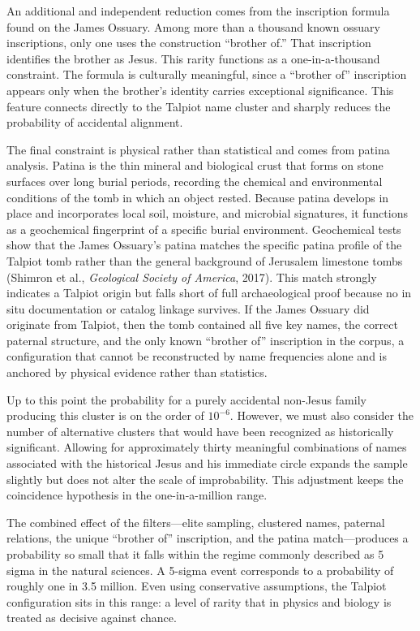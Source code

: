 An additional and independent reduction comes from the inscription formula found on the James Ossuary.
Among more than a thousand known ossuary inscriptions, only one uses the construction ``brother of.''
That inscription identifies the brother as Jesus.
This rarity functions as a one-in-a-thousand constraint.
The formula is culturally meaningful, since a ``brother of'' inscription appears only when the brother's identity carries exceptional significance.
This feature connects directly to the Talpiot name cluster and sharply reduces the probability of accidental alignment.

The final constraint is physical rather than statistical and comes from patina analysis.
Patina is the thin mineral and biological crust that forms on stone surfaces over long burial periods, recording the chemical and environmental conditions of the tomb in which an object rested.
Because patina develops in place and incorporates local soil, moisture, and microbial signatures, it functions as a geochemical fingerprint of a specific burial environment.
Geochemical tests show that the James Ossuary's patina matches the specific patina profile of the Talpiot tomb rather than the general background of Jerusalem limestone tombs (Shimron et al., \emph{Geological Society of America}, 2017).
This match strongly indicates a Talpiot origin but falls short of full archaeological proof because no in situ documentation or catalog linkage survives.
If the James Ossuary did originate from Talpiot, then the tomb contained all five key names, the correct paternal structure, and the only known ``brother of'' inscription in the corpus, a configuration that cannot be reconstructed by name frequencies alone and is anchored by physical evidence rather than statistics.

Up to this point the probability for a purely accidental non-Jesus family producing this cluster is on the order of $10^{-6}$.
However, we must also consider the number of alternative clusters that would have been recognized as historically significant.
Allowing for approximately thirty meaningful combinations of names associated with the historical Jesus and his immediate circle expands the sample slightly but does not alter the scale of improbability.
This adjustment keeps the coincidence hypothesis in the one-in-a-million range.

The combined effect of the filters---elite sampling, clustered names, paternal relations, the unique ``brother of'' inscription, and the patina match---produces a probability so small that it falls within the regime commonly described as 5 sigma in the natural sciences.
A 5-sigma event corresponds to a probability of roughly one in 3.5 million.
Even using conservative assumptions, the Talpiot configuration sits in this range: a level of rarity that in physics and biology is treated as decisive against chance.

